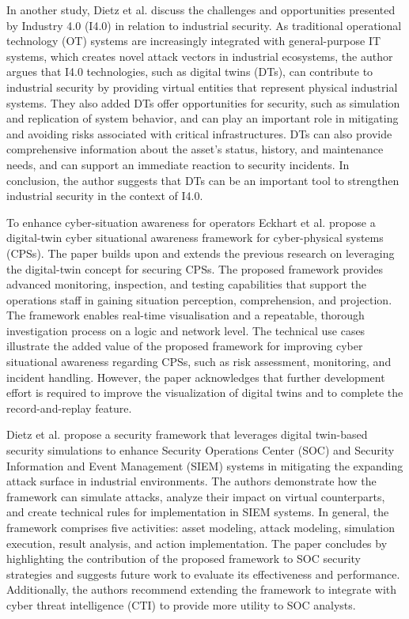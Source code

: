 In another study, Dietz et al.\cite{dietzUnleashingDigitalTwin2020} discuss the challenges and opportunities presented by Industry 4.0 (I4.0) in relation to industrial security. As traditional operational technology (OT) systems are increasingly integrated with general-purpose IT systems, which creates novel attack vectors in industrial ecosystems, the author argues that I4.0 technologies, such as digital twins (DTs), can contribute to industrial security by providing virtual entities that represent physical industrial systems. They also added DTs offer opportunities for security, such as simulation and replication of system behavior, and can play an important role in mitigating and avoiding risks associated with critical infrastructures. DTs can also provide comprehensive information about the asset's status, history, and maintenance needs, and can support an immediate reaction to security incidents. In conclusion, the author suggests that DTs can be an important tool to strengthen industrial security in the context of I4.0.


To enhance cyber-situation awareness for operators Eckhart et al.\cite{eckhartEnhancingCyberSituational2019} propose a digital-twin cyber situational awareness framework for cyber-physical systems (CPSs). The paper builds upon and extends the previous research on leveraging the digital-twin concept for securing CPSs. The proposed framework provides advanced monitoring, inspection, and testing capabilities that support the operations staff in gaining situation perception, comprehension, and projection. The framework enables real-time visualisation and a repeatable, thorough investigation process on a logic and network level. The technical use cases illustrate the added value of the proposed framework for improving cyber situational awareness regarding CPSs, such as risk assessment, monitoring, and incident handling. However, the paper acknowledges that further development effort is required to improve the visualization of digital twins and to complete the record-and-replay feature. 


Dietz et al.\cite{dietzIntegratingDigitalTwin2020} propose a security framework that leverages digital twin-based security simulations to enhance Security Operations Center (SOC) and Security Information and Event Management (SIEM) systems in mitigating the expanding attack surface in industrial environments. The authors demonstrate how the framework can simulate attacks, analyze their impact on virtual counterparts, and create technical rules for implementation in SIEM systems. In general, the framework comprises five activities: asset modeling, attack modeling, simulation execution, result analysis, and action implementation. The paper concludes by highlighting the contribution of the proposed framework  to SOC security strategies and suggests future work to evaluate its effectiveness and performance. Additionally, the authors recommend extending the framework to integrate with cyber threat intelligence (CTI) to provide more utility to SOC analysts.

